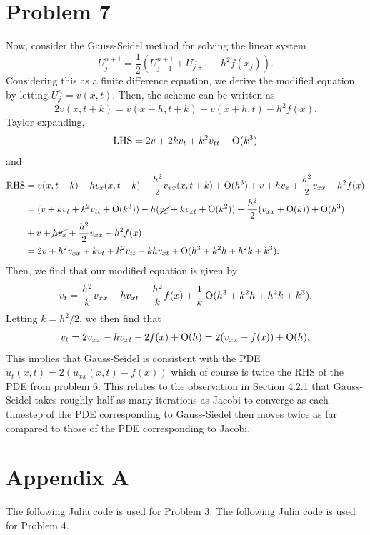 \documentclass{article}
\begin{document}
\section{Problem 7}
Now, consider the Gauss-Seidel method for solving the linear system
$$
U_{j}^{n+1}=\frac{1}{2}\left(U_{j-1}^{n+1}+U_{j+1}^{n}-h^{2} f\left(x_{j}\right)\right).
$$
Considering this as a finite difference equation, we derive the modified equation by letting $U^n_j=v(x,t)$. Then, the scheme can be written as
\[
2v(x,t+k)=v(x-h,t+k)+v(x+h,t)-h^2f(x).
\]
Taylor expanding, 
\[
\text{LHS}=2v+2kv_t+k^2v_{tt}+\operatorname{O}(k^3)
\]
and 
\begin{align*}
\text{RHS}&=v(x,t+k)-hv_x(x,t+k)+\frac{h^2}{2}v_{xx}(x,t+k)+\operatorname{O}(h^3)+v+hv_x+\frac{h^2}{2}v_{xx}-h^2f(x)\\&=
(v+kv_t+k^2v_{tt}+\operatorname{O}(k^3))-h(\cancel{v_x}+kv_{xt}+\operatorname{O}(k^2))+\frac{h^2}{2}(v_{xx}+\operatorname{O}(k))+\operatorname{O}(h^3)\\&+v+\cancel{hv_x}+\frac{h^2}{2}v_{xx}-h^2f(x)\\&=
2v+h^2v_{xx}+kv_t+k^2v_{tt}-khv_{xt}+\operatorname{O}(h^3+k^2h+h^2k+k^3).
\end{align*}
Then, we find that our modified equation is given by
\[
v_t=\frac{h^2}{k}v_{xx}-hv_{xt}-\frac{h^2}{k}f(x)+\frac{1}{k}\operatorname{O}(h^3+k^2h+h^2k+k^3).
\]
Letting $k=h^2/2$, we then find that 
\begin{align*}
v_t=2v_{xx}-hv_{xt}-2f(x)+\operatorname{O}(h)=2(v_{xx}-f(x))+\operatorname{O}(h).
\end{align*}
This implies that Gauss-Seidel is consistent with the PDE $u_t(x,t)=2(u_{xx}(x,t)-f(x))$ which of course is twice the RHS of the PDE from problem 6. This relates to the observation in Section 4.2.1 that Gauss-Seidel takes roughly half as many iterations as Jacobi to converge as each timestep of the PDE corresponding to Gauss-Siedel then moves twice as far compared to those of the PDE corresponding to Jacobi.

\section{Appendix A}
The following Julia code is used for Problem 3.
The following Julia code is used for Problem 4.
\end{document}
